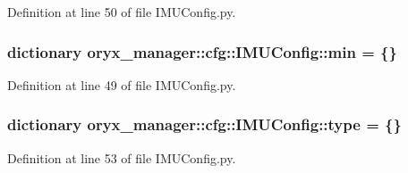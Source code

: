 \-Definition at line 50 of file \-I\-M\-U\-Config.\-py.

\subsubsection[{min}]{\setlength{\rightskip}{0pt plus 5cm}dictionary {\bf oryx\-\_\-manager\-::cfg\-::\-I\-M\-U\-Config\-::min} = \{\}}\label{namespaceoryx__manager_1_1cfg_1_1IMUConfig_a440acbba9ae28332142821bba26c781b}


\-Definition at line 49 of file \-I\-M\-U\-Config.\-py.

\subsubsection[{type}]{\setlength{\rightskip}{0pt plus 5cm}dictionary {\bf oryx\-\_\-manager\-::cfg\-::\-I\-M\-U\-Config\-::type} = \{\}}\label{namespaceoryx__manager_1_1cfg_1_1IMUConfig_a5e7c66215c2053b412a35c9cf7b1bec3}


\-Definition at line 53 of file \-I\-M\-U\-Config.\-py.

